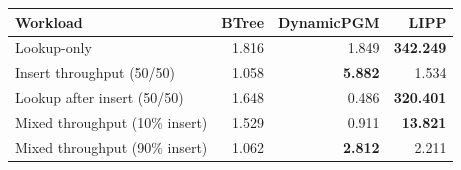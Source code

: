 \begin{tabular}{lrrr}
\toprule
Workload & BTree & DynamicPGM & LIPP \\
\midrule
Lookup-only & 1.816 & 1.849 & \textbf{342.249} \\
Insert throughput (50/50) & 1.058 & \textbf{5.882} & 1.534 \\
Lookup after insert (50/50) & 1.648 & 0.486 & \textbf{320.401} \\
Mixed throughput (10\% insert) & 1.529 & 0.911 & \textbf{13.821} \\
Mixed throughput (90\% insert) & 1.062 & \textbf{2.812} & 2.211 \\
\bottomrule
\end{tabular}
